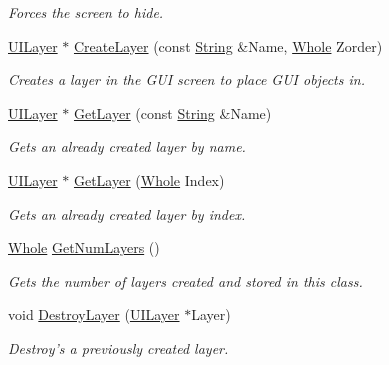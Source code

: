 \begin{DoxyCompactItemize}
\begin{DoxyCompactList}\small\item\em Forces the screen to hide. \item\end{DoxyCompactList}\item 
\hyperlink{classphys_1_1UILayer}{UILayer} $\ast$ \hyperlink{classphys_1_1UIScreen_a14c3256bda81d40553ff065993fcbe77}{CreateLayer} (const \hyperlink{namespacephys_aa03900411993de7fbfec4789bc1d392e}{String} \&Name, \hyperlink{namespacephys_a460f6bc24c8dd347b05e0366ae34f34a}{Whole} Zorder)
\begin{DoxyCompactList}\small\item\em Creates a layer in the GUI screen to place GUI objects in. \item\end{DoxyCompactList}\item 
\hyperlink{classphys_1_1UILayer}{UILayer} $\ast$ \hyperlink{classphys_1_1UIScreen_a661f461325f3a67169ce0c4ee107c8eb}{GetLayer} (const \hyperlink{namespacephys_aa03900411993de7fbfec4789bc1d392e}{String} \&Name)
\begin{DoxyCompactList}\small\item\em Gets an already created layer by name. \item\end{DoxyCompactList}\item 
\hyperlink{classphys_1_1UILayer}{UILayer} $\ast$ \hyperlink{classphys_1_1UIScreen_a8b9aeb4599c47d2b4ea0a1c5d5e6f210}{GetLayer} (\hyperlink{namespacephys_a460f6bc24c8dd347b05e0366ae34f34a}{Whole} Index)
\begin{DoxyCompactList}\small\item\em Gets an already created layer by index. \item\end{DoxyCompactList}\item 
\hyperlink{namespacephys_a460f6bc24c8dd347b05e0366ae34f34a}{Whole} \hyperlink{classphys_1_1UIScreen_a87c4cf832f36af0182483814fec30f88}{GetNumLayers} ()
\begin{DoxyCompactList}\small\item\em Gets the number of layers created and stored in this class. \item\end{DoxyCompactList}\item 
void \hyperlink{classphys_1_1UIScreen_ac1d9dfc0b8d9b3720f1447dcc93d8b55}{DestroyLayer} (\hyperlink{classphys_1_1UILayer}{UILayer} $\ast$Layer)
\begin{DoxyCompactList}\small\item\em Destroy's a previously created layer. \item\end{DoxyCompactList}\item 

\end{DoxyCompactItemize}
